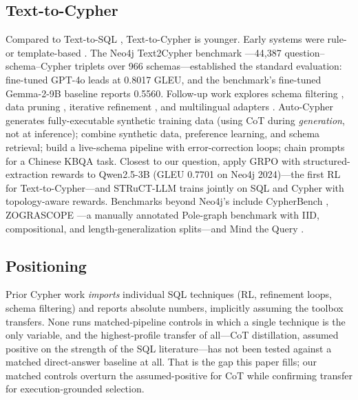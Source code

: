 \documentclass[11pt]{article}
\begin{document}
\subsection{Text-to-Cypher}
\label{sec:rw-cypher}
Compared to Text-to-SQL \citep{mohammadjafari2024survey, liu2024survey}, Text-to-Cypher is younger.
Early systems were rule- or template-based \citep{kobeissi2021intent, nie2022graphqir}. The Neo4j
Text2Cypher benchmark \citep{ozsoy2025text2cypher}---44{,}387 question--schema--Cypher triplets over
966 schemas---established the standard evaluation: fine-tuned GPT-4o leads at 0.8017 GLEU, and the
benchmark's fine-tuned Gemma-2-9B baseline reports 0.5560. Follow-up work explores schema filtering
\citep{ozsoy2025schema}, data pruning \citep{ozsoy2025pruning}, iterative refinement
\citep{ozsoy2025iterative}, and multilingual adapters \citep{ozsoy2026adapter}. Auto-Cypher
\citep{tiwari2025autocypher} generates fully-executable synthetic training data (using CoT during
\emph{generation}, not at inference); \citet{yang2026pipeline} combine synthetic data, preference
learning, and schema retrieval; \citet{hornsteiner2024realtime} build a live-schema pipeline with
error-correction loops; \citet{feng2023chain} chain prompts for a Chinese KBQA task. Closest to our
question, \citet{tran2025refining} apply GRPO with structured-extraction rewards to Qwen2.5-3B (GLEU
0.7701 on Neo4j 2024)---the first RL for Text-to-Cypher---and STRuCT-LLM \citep{structllm2025} trains
jointly on SQL and Cypher with topology-aware rewards. Benchmarks beyond Neo4j's include CypherBench
\citep{cypherbench2025}, ZOGRASCOPE \citep{zograscope2025}---a manually annotated Pole-graph benchmark
with IID, compositional, and length-generalization splits---and Mind the Query \citep{mindthequery2025}.

\subsection{Positioning}
Prior Cypher work \emph{imports} individual SQL techniques (RL, refinement loops, schema filtering)
and reports absolute numbers, implicitly assuming the toolbox transfers. None runs matched-pipeline
controls in which a single technique is the only variable, and the highest-profile transfer of
all---CoT distillation, assumed positive on the strength of the SQL literature---has not been tested
against a matched direct-answer baseline at all. That is the gap this paper fills; our matched
controls overturn the assumed-positive for CoT while confirming transfer for execution-grounded
selection.
\end{document}
